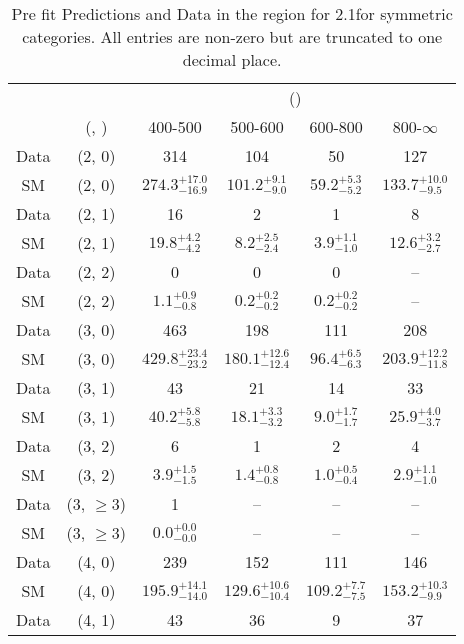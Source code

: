 \begin{table}[h!]
\tiny
\centering
\caption{Pre fit Predictions and Data in the \gj region for 2.1\ifb for symmetric categories. All entries are non-zero but are truncated to one decimal place.\label{tab:predallnaive_gj_comb_sym}}
\begin{tabular}
{cccccc}
	\hline\hline
	&	& \multicolumn{4}{c}{\scalht (\gev)}\\ 
	&	 (\njet, \nb) & 400-500 & 500-600 & 600-800 & 800-$\infty$ \\ [0.8ex] 
\hline
	Data & (2, 0) & 314 & 104 & 50 & 127 \\[0.5ex] 
	SM & (2, 0) & $274.3^{+ 17.0 }_{- 16.9 }$ & $101.2^{+ 9.1 }_{- 9.0 }$ & $59.2^{+ 5.3 }_{- 5.2 }$ & $133.7^{+ 10.0 }_{- 9.5 }$ \\[0.5ex] 
	Data & (2, 1) & 16 & 2 & 1 & 8 \\[0.5ex] 
	SM & (2, 1) & $19.8^{+ 4.2 }_{- 4.2 }$ & $8.2^{+ 2.5 }_{- 2.4 }$ & $3.9^{+ 1.1 }_{- 1.0 }$ & $12.6^{+ 3.2 }_{- 2.7 }$ \\[0.5ex] 
	Data & (2, 2) & 0 & 0 & 0 & -- \\[0.5ex] 
	SM & (2, 2) & $1.1^{+ 0.9 }_{- 0.8 }$ & $0.2^{+ 0.2 }_{- 0.2 }$ & $0.2^{+ 0.2 }_{- 0.2 }$ & -- \\[0.5ex] 
	Data & (3, 0) & 463 & 198 & 111 & 208 \\[0.5ex] 
	SM & (3, 0) & $429.8^{+ 23.4 }_{- 23.2 }$ & $180.1^{+ 12.6 }_{- 12.4 }$ & $96.4^{+ 6.5 }_{- 6.3 }$ & $203.9^{+ 12.2 }_{- 11.8 }$ \\[0.5ex] 
	Data & (3, 1) & 43 & 21 & 14 & 33 \\[0.5ex] 
	SM & (3, 1) & $40.2^{+ 5.8 }_{- 5.8 }$ & $18.1^{+ 3.3 }_{- 3.2 }$ & $9.0^{+ 1.7 }_{- 1.7 }$ & $25.9^{+ 4.0 }_{- 3.7 }$ \\[0.5ex] 
	Data & (3, 2) & 6 & 1 & 2 & 4 \\[0.5ex] 
	SM & (3, 2) & $3.9^{+ 1.5 }_{- 1.5 }$ & $1.4^{+ 0.8 }_{- 0.8 }$ & $1.0^{+ 0.5 }_{- 0.4 }$ & $2.9^{+ 1.1 }_{- 1.0 }$ \\[0.5ex] 
	Data & (3, $\ge3$) & 1 & -- & -- & -- \\[0.5ex] 
	SM & (3, $\ge3$) & $0.0^{+ 0.0 }_{- 0.0 }$ & -- & -- & -- \\[0.5ex] 
	Data & (4, 0) & 239 & 152 & 111 & 146 \\[0.5ex] 
	SM & (4, 0) & $195.9^{+ 14.1 }_{- 14.0 }$ & $129.6^{+ 10.6 }_{- 10.4 }$ & $109.2^{+ 7.7 }_{- 7.5 }$ & $153.2^{+ 10.3 }_{- 9.9 }$ \\[0.5ex] 
	Data & (4, 1) & 43 & 36 & 9 & 37 \\[0.5ex] 

\end{tabular}
\end{table}
